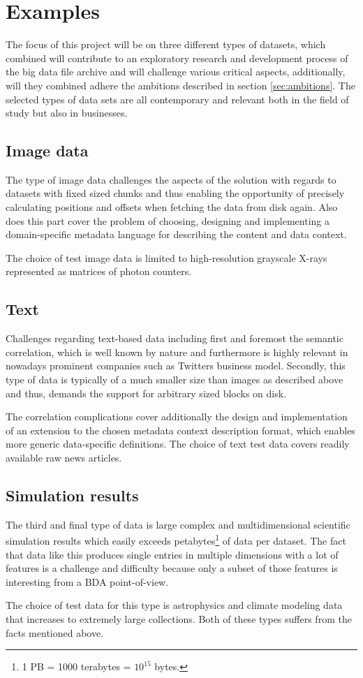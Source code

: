 \section{Examples}
The focus of this project will be on three different types of datasets, which combined will contribute to an exploratory research and development process of the big data file archive and will challenge various critical aspects, additionally, will they combined adhere the ambitions described in section \ref{sec:ambitions}. The selected types of data sets are all contemporary and relevant both in the field of study but also in businesses.

\subsection*{Image data}
The type of image data challenges the aspects of the solution with regards to datasets with fixed sized chunks and thus enabling the opportunity of precisely calculating positions and offsets when fetching the data from disk again. Also does this part cover the problem of choosing, designing and implementing a domain-specific metadata language for describing the content and data context. 

The choice of test image data is limited to high-resolution grayscale X-rays represented as matrices of photon counters.

\subsection*{Text}
Challenges regarding text-based data including first and foremost the semantic correlation, which is well known by nature and furthermore is highly relevant in nowadays prominent companies such as Twitters business model. Secondly, this type of data is typically of a much smaller size than \eg images as described above and thus, demands the support for arbitrary sized blocks on disk. 

The correlation complications cover additionally the design and implementation of an extension to the chosen metadata context description format, which enables more generic data-specific definitions. The choice of text test data covers \eg readily available raw news articles.

\subsection*{Simulation results}
The third and final type of data is large complex and multidimensional scientific simulation results which easily exceeds petabytes\footnote{1 PB =  1000 terabytes = $10^{15}$ bytes.} of data per dataset. The fact that data like this produces single entries in multiple dimensions with a lot of features is a challenge and difficulty because only a subset of those features is interesting from a BDA point-of-view.

The choice of test data for this type is astrophysics and climate modeling data that increases to extremely large collections. Both of these types suffers from the facts mentioned above.
